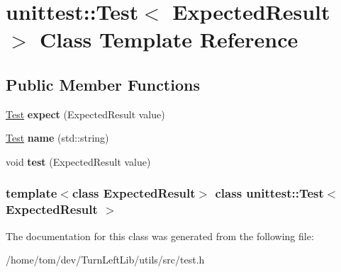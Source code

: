 \hypertarget{classunittest_1_1Test}{
\section{unittest::Test$<$ ExpectedResult $>$ Class Template Reference}
\label{classunittest_1_1Test}
}
\subsection*{Public Member Functions}
\begin{DoxyCompactItemize}
\item 
\hypertarget{classunittest_1_1Test_a1903e808d53a1fd1c7550f8af6a0bdaf}{
\hyperlink{classunittest_1_1Test}{Test} {\bfseries expect} (ExpectedResult value)}
\label{classunittest_1_1Test_a1903e808d53a1fd1c7550f8af6a0bdaf}

\item 
\hypertarget{classunittest_1_1Test_a6a0f892a9db7f6c11b1b237f1b46e487}{
\hyperlink{classunittest_1_1Test}{Test} {\bfseries name} (std::string)}
\label{classunittest_1_1Test_a6a0f892a9db7f6c11b1b237f1b46e487}

\item 
\hypertarget{classunittest_1_1Test_a68e6b4f7a18747533b9000640a8e0abb}{
void {\bfseries test} (ExpectedResult value)}
\label{classunittest_1_1Test_a68e6b4f7a18747533b9000640a8e0abb}

\end{DoxyCompactItemize}
\subsubsection*{template$<$class ExpectedResult$>$ class unittest::Test$<$ ExpectedResult $>$}



The documentation for this class was generated from the following file:\begin{DoxyCompactItemize}
\item 
/home/tom/dev/TurnLeftLib/utils/src/test.h\end{DoxyCompactItemize}
